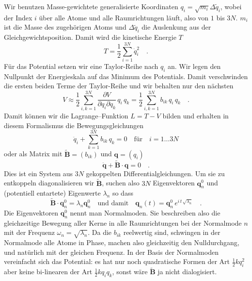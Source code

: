 Wir benutzen Masse-gewichtete generalisierte Koordinaten $q_i = \sqrt{m_i}  \Delta \tilde{q}_i$, wobei der Index $i$ über alle Atome und alle Raumrichtungen läuft, also von $1$ bis $3N$. $m_i$ ist die Masse des zugehörigen Atoms und 
$\Delta \tilde{q}_i$ die Auslenkung aus der Gleichgewichtsposition. Damit wird  die kinetische Energie $T$ 
\begin{equation}
T = \frac{1}{2} \sum_{i=1}^{3N} \dot{q}_i^2 \quad .
\end{equation}
Für das Potential setzen wir eine Taylor-Reihe nach $q_i$ an. Wir legen den Nullpunkt der Energieskala auf das Minimum des Potentials. Damit verschwinden die ersten beiden Terme der Taylor-Reihe und wir behalten nur den nächsten
\begin{equation}
V \approx \frac{1}{2} \sum_{i,k = 1}^{3N} \frac{\partial V}{\partial q_i \partial q_k} \, q_i \, q_k = 
 \frac{1}{2} \sum_{i,k = 1}^{3N} b_{ik} \, q_i \, q_k  \quad .
\end{equation}
Damit können wir die Lagrange--Funktion $L = T - V$ bilden und erhalten in diesem Formalismus die Bewegungsgleichungen
\begin{equation}
 \ddot{q}_i + \sum_{k = 1}^{3N} b_{ik} \, q_k = 0 \quad \text{für} \quad i = 1 \dots 3N
\end{equation}
oder als Matrix mit $\tilde{\mathbf{B}} = (b_{ik})$ und $\mathbf{q} = (q_i)$
\begin{equation}
\ddot{\mathbf{q}} + \tilde{\mathbf{B}}  \cdot  \mathbf{q} = 0 \quad .
\end{equation}
Dies ist ein System aus $3N$ gekoppelten Differentialgleichungen. Um sie zu entkoppeln diagonalisieren wir 
$\tilde{\mathbf{B}} $, suchen also $3N$ Eigenvektoren   $\mathbf{q}_n^0$ und (potentiell entartete) Eigenwerte $\lambda_n$ so dass
\begin{equation}
 \tilde{\mathbf{B}} \cdot \mathbf{q}_n^0 = \lambda_n \mathbf{q}_n^0 \quad \text{und damit} \quad
 \mathbf{q}_n(t) =  \mathbf{q}_n^0 \, e^{i \, t \, \sqrt{\lambda_n}} \quad .
\end{equation}
Die Eigenvektoren   $\mathbf{q}_n^0$ nennt man Normalmoden. Sie beschreiben also die gleichzeitige Bewegung aller Kerne in alle Raumrichtungen bei der Normal\-mode $n$ mit der Frequenz $\omega_n = \sqrt{\lambda_n}$. Da die $b_{ik}$ reelwertig sind, schwingen in der Normalmode alle Atome in Phase, machen also gleichzeitig den Nulldurchgang, und natürlich mit der gleichen Frequenz. In der Basis der Normalmoden vereinfacht sich das Potential: es hat nur noch quadratische Formen der Art $\frac{1}{2} k q_i^2$ aber keine bi-linearen der Art $\frac{1}{2} k q_i q_k$, sonst wäre $\tilde{\mathbf{B}} $ ja nicht dialogisiert.

